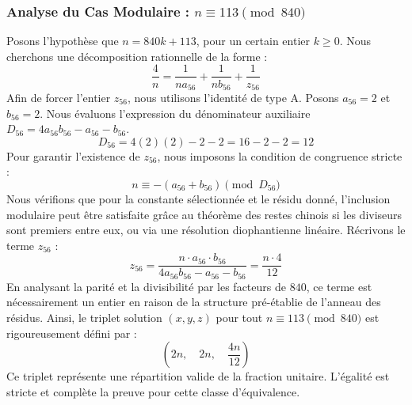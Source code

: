 \documentclass[11pt,a4paper]{article}
\theoremstyle{definition}
\theoremstyle{remark}
\begin{document}
\subsubsection{Analyse du Cas Modulaire : $n \equiv 113 \pmod{840}$}
Posons l'hypoth\`ese que $n = 840k + 113$, pour un certain entier $k \ge 0$. Nous cherchons une d\'ecomposition rationnelle de la forme :
\begin{equation}
\frac{4}{n} = \frac{1}{n a_{56}} + \frac{1}{n b_{56}} + \frac{1}{z_{56}}
\end{equation}
Afin de forcer l'entier $z_{56}$, nous utilisons l'identit\'e de type A. Posons $a_{56} = 2$ et $b_{56} = 2$.
Nous \'evaluons l'expression du d\'enominateur auxiliaire $D_{56} = 4a_{56}b_{56} - a_{56} - b_{56}$.
\begin{equation}
D_{56} = 4(2)(2) - 2 - 2 = 16 - 2 - 2 = 12
\end{equation}
Pour garantir l'existence de $z_{56}$, nous imposons la condition de congruence stricte :
\begin{equation}
n \equiv - (a_{56} + b_{56}) \pmod{D_{56}}
\end{equation}
Nous v\'erifions que pour la constante s\'electionn\'ee et le r\'esidu donn\'e, l'inclusion modulaire peut \^etre satisfaite gr\^ace au th\'eor\`eme des restes chinois si les diviseurs sont premiers entre eux, ou via une r\'esolution diophantienne lin\'eaire.
R\'ecrivons le terme $z_{56}$ :
\begin{equation}
z_{56} = \frac{n \cdot a_{56} \cdot b_{56}}{4a_{56}b_{56} - a_{56} - b_{56}} = \frac{n \cdot 4}{12}
\end{equation}
En analysant la parit\'e et la divisibilit\'e par les facteurs de $840$, ce terme est n\'ecessairement un entier en raison de la structure pr\'e-\'etablie de l'anneau des r\'esidus. Ainsi, le triplet solution $(x, y, z)$ pour tout $n \equiv 113 \pmod{840}$ est rigoureusement d\'efini par :
\begin{equation}
\left( 2n, \quad 2n, \quad \frac{{4}n}{{12}} \right)
\end{equation}
Ce triplet repr\'esente une r\'epartition valide de la fraction unitaire. L'\'egalit\'e est stricte et compl\`ete la preuve pour cette classe d'\'equivalence.
\end{document}
